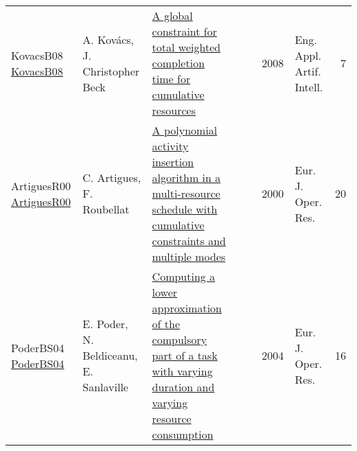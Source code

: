 {\begin{longtable}{p{3cm}p{6cm}p{7cm}rrrp{3cm}r}
KovacsB08 \href{https://doi.org/10.1016/j.engappai.2008.03.004}{KovacsB08} & A. Kov{\'{a}}cs, J. Christopher Beck & \href{articles/KovacsB08.pdf}{A global constraint for total weighted completion time for cumulative resources} &  & \cite{KovacsB08} & 2008 & Eng. Appl. Artif. Intell. & 7\\
ArtiguesR00 \href{https://doi.org/10.1016/S0377-2217(99)00496-8}{ArtiguesR00} & C. Artigues, F. Roubellat & \href{articles/ArtiguesR00.pdf}{A polynomial activity insertion algorithm in a multi-resource schedule with cumulative constraints and multiple modes} &  & \cite{ArtiguesR00} & 2000 & Eur. J. Oper. Res. & 20\\
PoderBS04 \href{https://doi.org/10.1016/S0377-2217(02)00756-7}{PoderBS04} & E. Poder, N. Beldiceanu, E. Sanlaville & \href{articles/PoderBS04.pdf}{Computing a lower approximation of the compulsory part of a task with varying duration and varying resource consumption} &  & \cite{PoderBS04} & 2004 & Eur. J. Oper. Res. & 16\\
\end{longtable}
}

